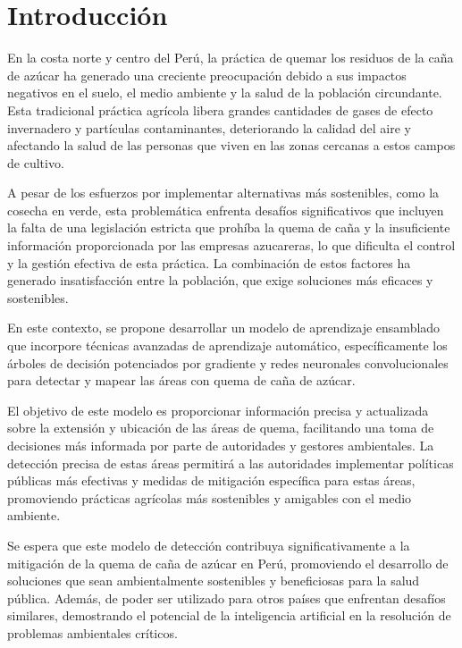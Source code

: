 \section{Introducción}
En la costa norte y centro del Perú, la práctica de quemar los residuos de la caña de azúcar ha generado una creciente preocupación debido a sus impactos negativos en el suelo, el medio ambiente y la salud 
de la población circundante. Esta tradicional práctica agrícola libera grandes cantidades de gases de efecto invernadero y partículas contaminantes, deteriorando la calidad del aire y afectando la salud de 
las personas que viven en las zonas cercanas a estos campos de cultivo.

A pesar de los esfuerzos por implementar alternativas más sostenibles, como la cosecha en verde, esta problemática enfrenta desafíos significativos que incluyen la falta de una legislación 
estricta que prohíba la quema de caña y la insuficiente información proporcionada por las empresas azucareras, lo que dificulta el control y la gestión efectiva de esta práctica. La combinación de estos factores 
ha generado insatisfacción entre la población, que exige soluciones más eficaces y sostenibles.

En este contexto, se propone desarrollar un modelo de aprendizaje ensamblado que incorpore técnicas avanzadas de aprendizaje automático, específicamente los árboles de decisión potenciados por gradiente y redes neuronales convolucionales para detectar 
y mapear las áreas con quema de caña de azúcar. 

El objetivo de este modelo es proporcionar información precisa y actualizada sobre la extensión y ubicación de las áreas de quema, facilitando una toma de decisiones más informada por parte de autoridades y gestores ambientales. 
La detección precisa de estas áreas permitirá a las autoridades implementar políticas públicas más efectivas y medidas de mitigación específica para estas áreas, promoviendo prácticas agrícolas más sostenibles y amigables con el medio ambiente.

Se espera que este modelo de detección contribuya significativamente a la mitigación de la quema de caña de azúcar en Perú, promoviendo el desarrollo de soluciones que sean ambientalmente sostenibles y beneficiosas para 
la salud pública. Además, de poder ser utilizado para otros países que enfrentan desafíos similares, demostrando el potencial de la inteligencia artificial en la resolución de problemas ambientales críticos.



